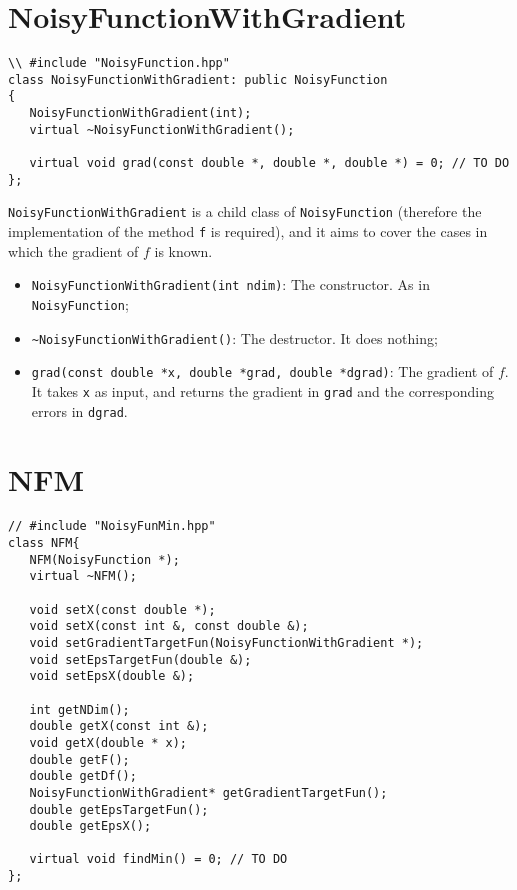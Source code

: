 \documentclass[11pt,a4paper,twoside]{article}
\begin{document}



\section{NoisyFunctionWithGradient} %
\label{sec:NoisyFunctionWithGradient}

\begin{lstlisting}
\\ #include "NoisyFunction.hpp"
class NoisyFunctionWithGradient: public NoisyFunction
{
   NoisyFunctionWithGradient(int);
   virtual ~NoisyFunctionWithGradient();
   
   virtual void grad(const double *, double *, double *) = 0; // TO DO
};
\end{lstlisting}

\verb+NoisyFunctionWithGradient+ is a child class of \verb+NoisyFunction+ (therefore the implementation of the method \verb+f+ is required), and it aims to cover the cases in which the gradient of $f$ is known.

\begin{itemize}
   \item \verb+NoisyFunctionWithGradient(int ndim)+: The constructor. As in \verb+NoisyFunction+;
   \item \verb+~NoisyFunctionWithGradient()+: The destructor. It does nothing;
   \item \verb+grad(const double *x, double *grad, double *dgrad)+: The gradient of $f$. It takes \verb+x+ as input, and returns the gradient in \verb+grad+ and the corresponding errors in \verb+dgrad+.
\end{itemize}




\section{NFM} %
\label{sec:nfm}

\begin{lstlisting}
// #include "NoisyFunMin.hpp"
class NFM{
   NFM(NoisyFunction *);                                       
   virtual ~NFM();
   
   void setX(const double *);
   void setX(const int &, const double &);
   void setGradientTargetFun(NoisyFunctionWithGradient *);          
   void setEpsTargetFun(double &); 
   void setEpsX(double &);                          
   
   int getNDim();                                         
   double getX(const int &);                    
   void getX(double * x);
   double getF();                             
   double getDf();                  
   NoisyFunctionWithGradient* getGradientTargetFun(); 
   double getEpsTargetFun();            
   double getEpsX();
   
   virtual void findMin() = 0; // TO DO
};
  
\end{lstlisting}
\end{document}
